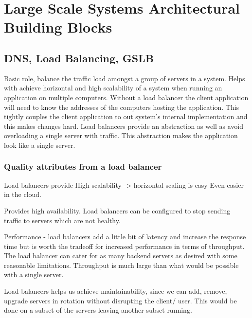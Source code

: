 \chapter{Large Scale Systems Architectural Building Blocks}


\section{DNS, Load Balancing, GSLB}
Basic role, balance the traffic load amongst a group of servers in a system.
Helps with achieve horizontal and high scalability of a system when running an application on multiple computers.
Without a load balancer the client application will need to know the addresses of the computers hosting the application.
This tightly couples the client application to out system's internal implementation and this makes changes hard.
Load balancers provide an abstraction as well as avoid overloading a single server with traffic.
This abstraction makes the application look like a single server.

\subsection{Quality attributes from a load balancer}
Load balancers provide
High scalability -> horizontal scaling is easy
Even easier in the cloud.

Provides high availability.
Load balancers can be configured to stop sending traffic to servers which are not healthy.

Performance - load balancers add a little bit of latency and increase the response time but is worth the tradeoff for increased performance in terms of throughput.
The load balancer can cater for as many backend servers as desired with some reasonable limitations.
Throughput is much large than what would be possible with a single server.

Load balancers helps us achieve maintainability, since we can add, remove, upgrade servers in rotation without disrupting the client/ user.
This would be done on a subset of the servers leaving another subset running.

